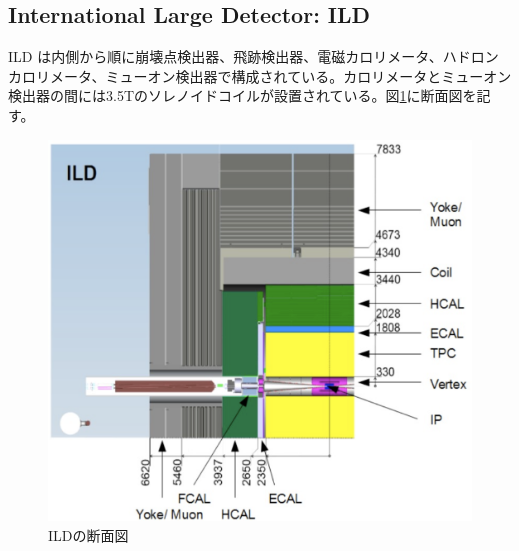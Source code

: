 \subsection{International Large Detector: ILD}
ILD \cite{tdr2}は内側から順に崩壊点検出器、飛跡検出器、電磁カロリメータ、ハドロンカロリメータ、ミューオン検出器で構成されている。カロリメータとミューオン検出器の間には3.5Tのソレノイドコイルが設置されている。図\ref{ild}に断面図を記す。\\
\begin{figure}[H]
	\begin{center}
 \includegraphics[keepaspectratio, scale=0.25]
 	{Figure/Introduction/ild.png}
 		\caption {ILDの断面図}
 		\label{ild}
	\end{center}
\end{figure}
